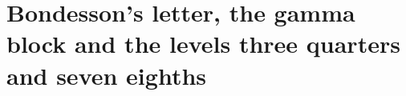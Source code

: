 \chapter{Bondesson's letter, the gamma block and the levels three quarters and seven eighths}\label{vol3:ch6}

